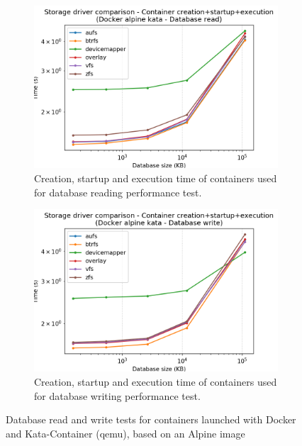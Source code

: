 \begin{figure}[h!]
    \begin{subfigure}{.5\textwidth}
      \centering
      \includegraphics[width=\linewidth]{images/storage-driver/storage-driver-full-Docker-alpine-kata---Database-read.png}
      \caption{Creation, startup and execution time of containers used for database reading performance test.}
      \label{fig:storage-driver:kata:db-read-full}
    \end{subfigure}
    \begin{subfigure}{.5\textwidth}
      \centering
      \includegraphics[width=\linewidth]{images/storage-driver/storage-driver-full-Docker-alpine-kata---Database-write.png}
      \caption{Creation, startup and execution time of containers used for database writing performance test.}
      \label{fig:storage-driver:kata:db-write-full}
    \end{subfigure}
    
    \caption{Database read and write tests for containers launched with Docker and Kata-Container (qemu), based on an Alpine image}
    \label{fig:storage-driver:kata:db}
\end{figure}

